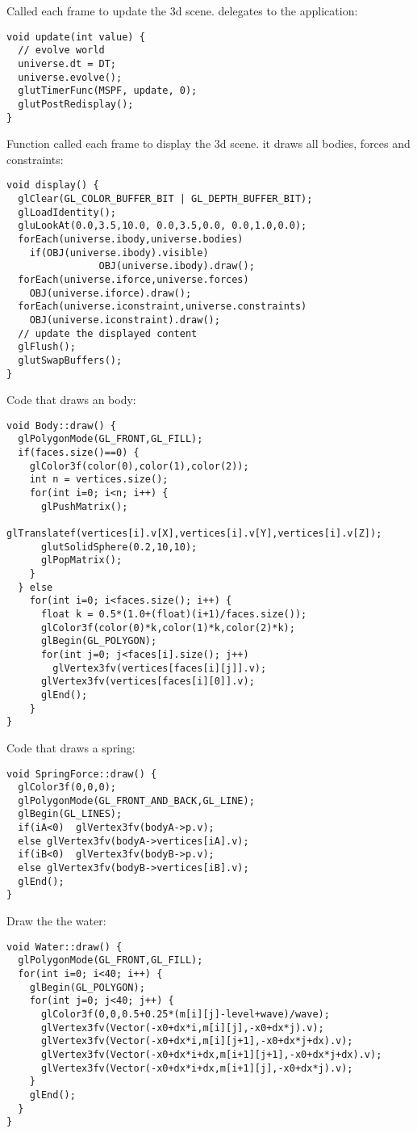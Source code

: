 \noindent
Called each frame to update the 3d scene. delegates to
the application: \begin{lstlisting}
void update(int value) {
  // evolve world
  universe.dt = DT;
  universe.evolve();
  glutTimerFunc(MSPF, update, 0);
  glutPostRedisplay();
}
\end{lstlisting}
\noindent
Function called each frame to display the 3d scene.
it draws all bodies, forces and constraints: \begin{lstlisting}
void display() {
  glClear(GL_COLOR_BUFFER_BIT | GL_DEPTH_BUFFER_BIT);
  glLoadIdentity();
  gluLookAt(0.0,3.5,10.0, 0.0,3.5,0.0, 0.0,1.0,0.0);
  forEach(universe.ibody,universe.bodies)
    if(OBJ(universe.ibody).visible)
                OBJ(universe.ibody).draw();
  forEach(universe.iforce,universe.forces)
    OBJ(universe.iforce).draw();
  forEach(universe.iconstraint,universe.constraints)
    OBJ(universe.iconstraint).draw();
  // update the displayed content
  glFlush();
  glutSwapBuffers();
}
\end{lstlisting}
\noindent
Code that draws an body: \begin{lstlisting}
void Body::draw() {
  glPolygonMode(GL_FRONT,GL_FILL);
  if(faces.size()==0) {
    glColor3f(color(0),color(1),color(2));
    int n = vertices.size();
    for(int i=0; i<n; i++) {
      glPushMatrix();
      glTranslatef(vertices[i].v[X],vertices[i].v[Y],vertices[i].v[Z]);
      glutSolidSphere(0.2,10,10);
      glPopMatrix();
    }
  } else
    for(int i=0; i<faces.size(); i++) {
      float k = 0.5*(1.0+(float)(i+1)/faces.size());
      glColor3f(color(0)*k,color(1)*k,color(2)*k);
      glBegin(GL_POLYGON);
      for(int j=0; j<faces[i].size(); j++)
        glVertex3fv(vertices[faces[i][j]].v);
      glVertex3fv(vertices[faces[i][0]].v);
      glEnd();
    }
}
\end{lstlisting}
\noindent
Code that draws a spring: \begin{lstlisting}
void SpringForce::draw() {
  glColor3f(0,0,0);
  glPolygonMode(GL_FRONT_AND_BACK,GL_LINE);
  glBegin(GL_LINES);
  if(iA<0)  glVertex3fv(bodyA->p.v);
  else glVertex3fv(bodyA->vertices[iA].v);
  if(iB<0)  glVertex3fv(bodyB->p.v);
  else glVertex3fv(bodyB->vertices[iB].v);
  glEnd();
}
\end{lstlisting}
\noindent
Draw the the water: \begin{lstlisting}
void Water::draw() {
  glPolygonMode(GL_FRONT,GL_FILL);
  for(int i=0; i<40; i++) {
    glBegin(GL_POLYGON);
    for(int j=0; j<40; j++) {
      glColor3f(0,0,0.5+0.25*(m[i][j]-level+wave)/wave);
      glVertex3fv(Vector(-x0+dx*i,m[i][j],-x0+dx*j).v);
      glVertex3fv(Vector(-x0+dx*i,m[i][j+1],-x0+dx*j+dx).v);
      glVertex3fv(Vector(-x0+dx*i+dx,m[i+1][j+1],-x0+dx*j+dx).v);
      glVertex3fv(Vector(-x0+dx*i+dx,m[i+1][j],-x0+dx*j).v);
    }
    glEnd();
  }
}
\end{lstlisting}
